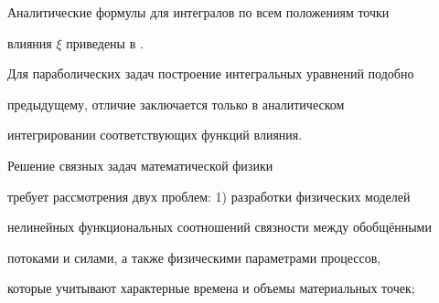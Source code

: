 




Аналитические формулы для интегралов по всем положениям точки

влияния $\xi $ приведены в \cite{fed:bib:Fed1,fed:bib:Fed2}.



Для параболических задач построение интегральных уравнений подобно

предыдущему, отличие заключается только в аналитическом

интегрировании соответствующих функций влияния.



\smallskip



 Решение связных задач математической физики

требует рассмотрения двух проблем: 1) разработки физических моделей

нелинейных функциональных соотношений связности между обобщёнными

потоками и силами, а также физическими параметрами процессов,

которые учитывают характерные времена и объемы материальных точек;

